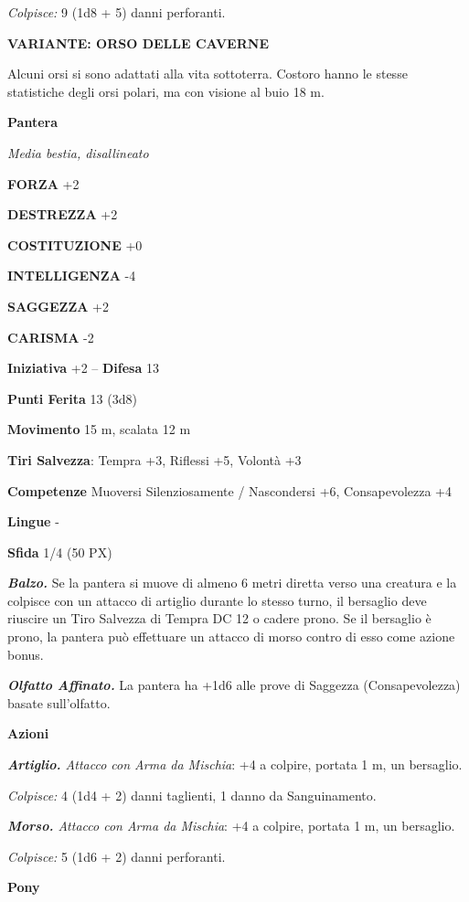 \begin{multicols}{2}
\textit{Colpisce:} 9 (1d8 + 5) danni perforanti.

\textbf{VARIANTE: ORSO DELLE CAVERNE}

Alcuni orsi si sono adattati alla vita sottoterra. Costoro hanno le stesse statistiche degli orsi polari, ma con visione al buio 18 m.

\medskip\textbf{Pantera}

\textit{Media bestia, disallineato}

\textbf{FORZA} +2

\textbf{DESTREZZA} +2

\textbf{COSTITUZIONE} +0

\textbf{INTELLIGENZA} -4

\textbf{SAGGEZZA} +2

\textbf{CARISMA} -2

\textbf{Iniziativa} +2 -- \textbf{Difesa} 13

\textbf{Punti Ferita} 13 (3d8)

\textbf{Movimento} 15 m, scalata 12 m

\textbf{Tiri Salvezza}: Tempra +3, Riflessi +5, Volontà +3

\textbf{Competenze} Muoversi Silenziosamente / Nascondersi +6, Consapevolezza +4

\textbf{Lingue} -

\textbf{Sfida} 1/4 (50 PX)

\textit{\textbf{Balzo.}} Se la pantera si muove di almeno 6 metri diretta verso una creatura e la colpisce con un attacco di artiglio durante lo stesso turno, il bersaglio deve riuscire un Tiro Salvezza di Tempra DC 12 o cadere prono. Se il bersaglio è prono, la pantera può effettuare un attacco di morso contro di esso come azione bonus.

\textit{\textbf{Olfatto Affinato.}} La pantera ha +1d6 alle prove di Saggezza (Consapevolezza) basate sull'olfatto.

\textbf{Azioni}

\textit{\textbf{Artiglio.} Attacco con Arma da Mischia}: +4 a colpire, portata 1 m, un bersaglio.

\textit{Colpisce:} 4 (1d4 + 2) danni taglienti, 1 danno da Sanguinamento.

\textit{\textbf{Morso.} Attacco con Arma da Mischia}: +4 a colpire, portata 1 m, un bersaglio.

\textit{Colpisce:} 5 (1d6 + 2) danni perforanti.


\medskip\textbf{Pony}


\end{multicols}
